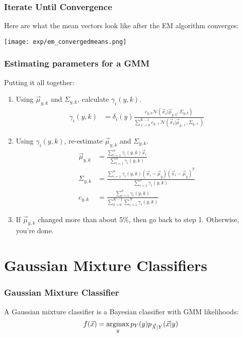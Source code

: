 \documentclass{beamer}
\newcommand{\argmax}{\operatornamewithlimits{argmax}}
\begin{document}
\begin{frame}
  \frametitle{Iterate Until Convergence}

  Here are what the mean vectors look like after the EM algorithm converges:
  \centerline{\texttt{[image: exp/em\_convergedmeans.png]}}
\end{frame}
  
\begin{frame}
  \frametitle{Estimating parameters for a GMM}
  
  Putting it all together:
  \begin{enumerate}
  \item
    Using $\vec\mu_{y,k}$ and $\Sigma_{y,k}$, calculate $\gamma_i(y,k)$.
    \begin{align*}
      \gamma_i(y,k)
      &=\delta_i(y)\frac{c_{y,k} {\mathcal N}(\vec{x}_i|\vec\mu_{y,k},\Sigma_{y,k})}{\sum_{\ell=0}^{K-1}c_{y,\ell} {\mathcal N}(\vec{x}_i|\vec\mu_{y,\ell},\Sigma_{y,\ell})}
    \end{align*}
  \item
    Using $\gamma_i(y,k)$, re-estimate $\vec\mu_{y,k}$ and $\Sigma_{y,k}$.
    \begin{align*}
      \vec\mu_{y,k} &=
      \frac{\sum_{i=1}^n \gamma_i(y,k) \vec{x}_i}{\sum_{i=1}^n\gamma_i(y,k)}\\
      \Sigma_{y,k} &=
      \frac{\sum_{i=1}^n \gamma_i(y,k) (\vec{x}_i-\vec\mu_y)(\vec{x}_i-\vec\mu_y)^T}{\sum_{i=1}^n\gamma_i(y,k)}\\
    c_{y,k} &= \frac{\sum_{i=1}^n \gamma_i(y,k)}{\sum_{k=0}^{K-1}\sum_{i=1}^N\gamma_i(y,k)}      
    \end{align*}
  \item
    If $\vec\mu_{y,k}$ changed more than about 5\%, then go back to
    step 1.  Otherwise, you're done.
  \end{enumerate}
\end{frame}

\section[GMC]{Gaussian Mixture Classifiers}
\setcounter{subsection}{1}

\begin{frame}
  \frametitle{Gaussian Mixture Classifier}

  A Gaussian mixture classifier is a Bayesian classifier with GMM likelihoods:
  \begin{displaymath}
    f(\vec{x}) = \argmax_y p_Y(y)p_{\vec{X}|Y}(\vec{x}|y)
  \end{displaymath}
\end{frame}
\end{document}
